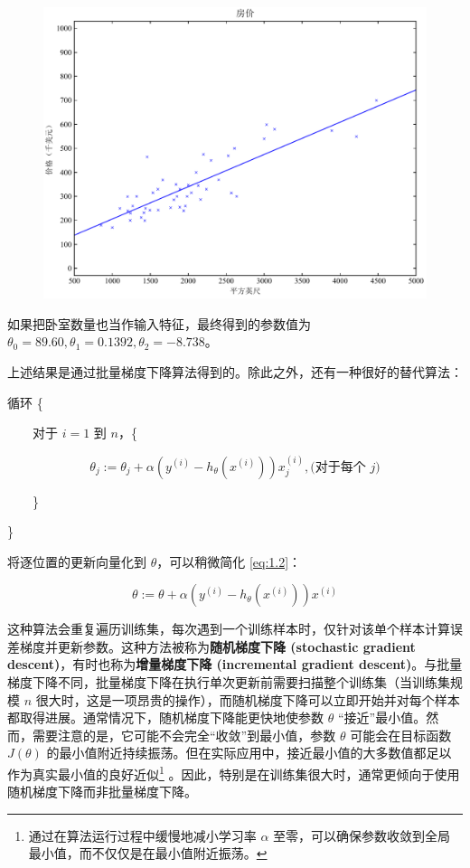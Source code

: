 \begin{figure}[H]
    \centering
    \includegraphics[width=0.5\linewidth]{figs/house_dataset_plot2.pdf}
\end{figure}
如果把卧室数量也当作输入特征，最终得到的参数值为 $\theta_0 = 89.60, \theta_1 = 0.1392, \theta_2 = -8.738$。

上述结果是通过批量梯度下降算法得到的。除此之外，还有一种很好的替代算法：

\vspace{0.5em}
循环 \{

$\quad\quad$对于 $i = 1$ 到 $n$，\{

\begin{equation}
    \theta_j := \theta_j + \alpha (y^{(i)} - h_\theta(x^{(i)})) x_j^{(i)}, \text{(对于每个 } j) \label{eq:1.2}
\end{equation}

$\quad\quad$\}

\indent\}
\vspace{0.5em}

将逐位置的更新向量化到 $\theta$，可以稍微简化 \eqref{eq:1.2}：

\[
    \theta := \theta + \alpha (y^{(i)} - h_\theta(x^{(i)})) x^{(i)}
\]

这种算法会重复遍历训练集，每次遇到一个训练样本时，仅针对该单个样本计算误差梯度并更新参数。这种方法被称为\textbf{随机梯度下降 (stochastic gradient descent)}，有时也称为\textbf{增量梯度下降 (incremental gradient descent)}。与批量梯度下降不同，批量梯度下降在执行单次更新前需要扫描整个训练集（当训练集规模 $n$ 很大时，这是一项昂贵的操作），而随机梯度下降可以立即开始并对每个样本都取得进展。通常情况下，随机梯度下降能更快地使参数 $\theta$ “接近”最小值。然而，需要注意的是，它可能不会完全“收敛”到最小值，参数 $\theta$ 可能会在目标函数 $J(\theta)$ 的最小值附近持续振荡。但在实际应用中，接近最小值的大多数值都足以作为真实最小值的良好近似\footnote{通过在算法运行过程中缓慢地减小学习率 $\alpha$ 至零，可以确保参数收敛到全局最小值，而不仅仅是在最小值附近振荡。} 。因此，特别是在训练集很大时，通常更倾向于使用随机梯度下降而非批量梯度下降。


